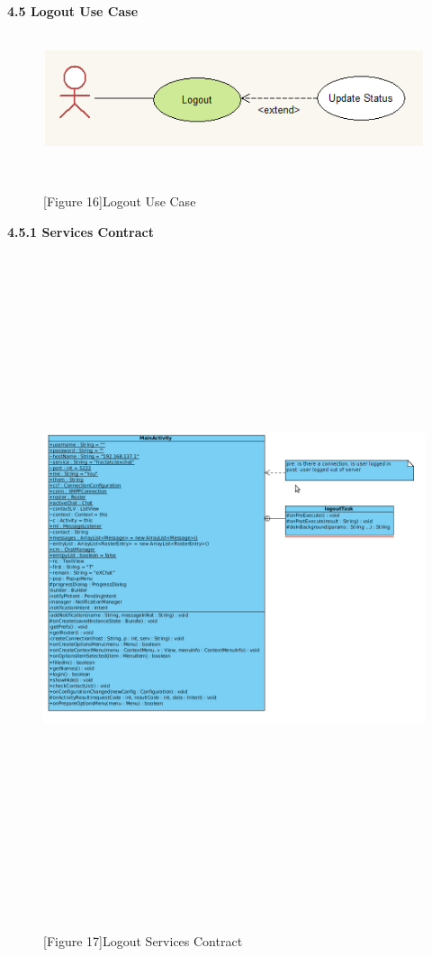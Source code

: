 \documentclass[29pt,a4paper]{moderncv}
\begin{document}
\newpage
	\left\textbf{4.5 Logout Use Case}
		\begin{figure}
			\centering
			\\ \includegraphics[width=5.5in, height=1.1in]{./ucLogout.png}
			\\\caption{[Figure 16]Logout Use Case}\\
		\end{figure}
		\newpage
		\noindent\left\textbf{4.5.1 Services Contract}\\ 
		\begin{figure}
							\centering
							\\ \includegraphics[width=7in, height=7.1in]{./2_LogoutSC.jpg}
							\\\caption{[Figure 17]Logout Services Contract} \\
						\end{figure}
						
\end{document}
